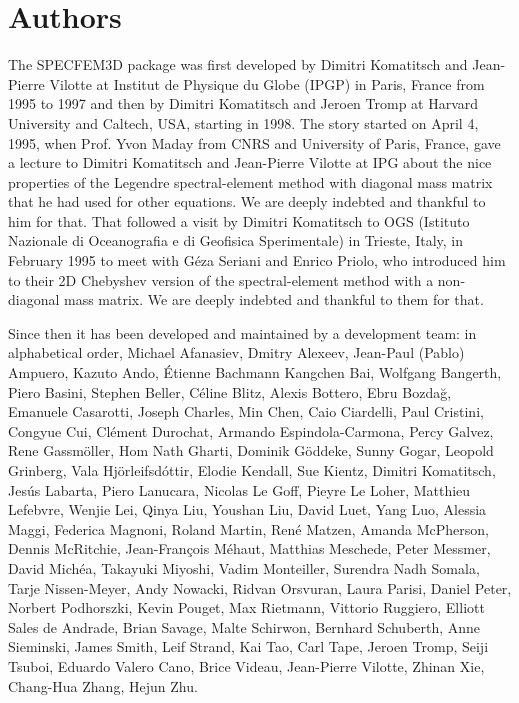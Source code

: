 \section*{Authors}

\noindent The SPECFEM3D package was first developed by Dimitri
Komatitsch and Jean-Pierre Vilotte at Institut de Physique du Globe
(IPGP) in Paris, France from 1995 to 1997 and then by Dimitri Komatitsch
and Jeroen Tromp at Harvard University and Caltech, USA, starting in 1998.
The story started on April 4, 1995, when Prof. Yvon Maday from CNRS and University of Paris, France, gave a lecture to
Dimitri Komatitsch and Jean-Pierre Vilotte at IPG about the nice properties of the Legendre spectral-element method with diagonal mass matrix that he had used for
other equations. We are deeply indebted and thankful to him for that.
That followed a visit by Dimitri Komatitsch to OGS (Istituto Nazionale di Oceanografia e di Geofisica Sperimentale) in Trieste, Italy, in February 1995
to meet with G\'eza Seriani and Enrico Priolo, who introduced him to their 2D Chebyshev version of the spectral-element method with a non-diagonal mass matrix.
We are deeply indebted and thankful to them for that.\newline

Since then it has been developed and maintained by a development team: in alphabetical order,
Michael Afanasiev,
Dmitry Alexeev,
Jean-Paul (Pablo) Ampuero,
Kazuto Ando,
\'Etienne Bachmann
Kangchen Bai,
Wolfgang Bangerth,
Piero Basini,
Stephen Beller,
C\'eline Blitz,
Alexis Bottero,
Ebru Bozda\u{g},
Emanuele Casarotti,
Joseph Charles,
Min Chen,
Caio Ciardelli,
Paul Cristini,
Congyue Cui,
Cl\'ement Durochat,
Armando Espindola-Carmona,
Percy Galvez,
Rene Gassm\"oller,
Hom Nath Gharti,
Dominik G\"oddeke,
Sunny Gogar,
Leopold Grinberg,
Vala Hj\"orleifsd\'ottir,
Elodie Kendall,
Sue Kientz,
Dimitri Komatitsch,
Jes\'us Labarta,
Piero Lanucara,
Nicolas Le Goff,
Pieyre Le Loher,
Matthieu Lefebvre,
Wenjie Lei,
Qinya Liu,
Youshan Liu,
David Luet,
Yang Luo,
Alessia Maggi,
Federica Magnoni,
Roland Martin,
Ren\'e Matzen,
Amanda McPherson,
Dennis McRitchie,
Jean-Fran\c{c}ois M\'ehaut,
Matthias Meschede,
Peter Messmer,
David Mich\'ea,
Takayuki Miyoshi,
Vadim Monteiller,
Surendra Nadh Somala,
Tarje Nissen-Meyer,
Andy Nowacki,
Ridvan Orsvuran,
Laura Parisi,
Daniel Peter,
Norbert Podhorszki,
Kevin Pouget,
Max Rietmann,
Vittorio Ruggiero,
Elliott Sales de Andrade,
Brian Savage,
Malte Schirwon,
Bernhard Schuberth,
Anne Sieminski,
James Smith,
Leif Strand,
Kai Tao,
Carl Tape,
Jeroen Tromp,
Seiji Tsuboi,
Eduardo Valero Cano,
Brice Videau,
Jean-Pierre Vilotte,
Zhinan Xie,
Chang-Hua Zhang,
Hejun Zhu.\newline


